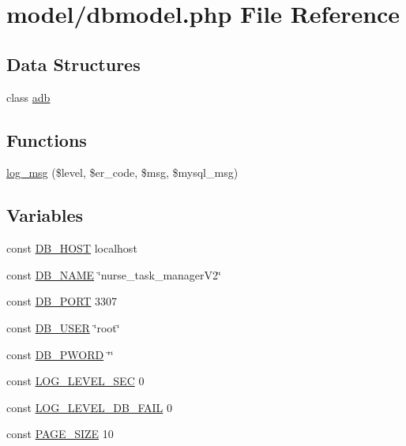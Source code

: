 \hypertarget{dbmodel_8php}{}\section{model/dbmodel.php File Reference}
\label{dbmodel_8php}
\subsection*{Data Structures}
\begin{DoxyCompactItemize}
\item 
class \hyperlink{classadb}{adb}
\end{DoxyCompactItemize}
\subsection*{Functions}
\begin{DoxyCompactItemize}
\item 
\hyperlink{dbmodel_8php_a1e25554d72181a453541a67aacceb663}{log\+\_\+msg} (\$level, \$er\+\_\+code, \$msg, \$mysql\+\_\+msg)
\end{DoxyCompactItemize}
\subsection*{Variables}
\begin{DoxyCompactItemize}
\item 
const \hyperlink{dbmodel_8php_a293363d7988627f671958e2d908c202a}{D\+B\+\_\+\+H\+O\+S\+T} \textquotesingle{}localhost\textquotesingle{}
\item 
const \hyperlink{dbmodel_8php_ab5db0d3504f917f268614c50b02c53e2}{D\+B\+\_\+\+N\+A\+M\+E} \char`\"{}nurse\+\_\+task\+\_\+manager\+V2\char`\"{}
\item 
const \hyperlink{dbmodel_8php_a5a1723fe7208eb06dad75185af8c3f06}{D\+B\+\_\+\+P\+O\+R\+T} 3307
\item 
const \hyperlink{dbmodel_8php_a1d1d99f8e08f387d84fe9848f3357156}{D\+B\+\_\+\+U\+S\+E\+R} \char`\"{}root\char`\"{}
\item 
const \hyperlink{dbmodel_8php_a83045a6202d81e1bd45c5bf19773579a}{D\+B\+\_\+\+P\+W\+O\+R\+D} \char`\"{}\char`\"{}
\item 
const \hyperlink{dbmodel_8php_a335d166b8615583931d3ff798c6e2fb1}{L\+O\+G\+\_\+\+L\+E\+V\+E\+L\+\_\+\+S\+E\+C} 0
\item 
const \hyperlink{dbmodel_8php_a44b26ee05d02c7acb05e8b44bbfe4a76}{L\+O\+G\+\_\+\+L\+E\+V\+E\+L\+\_\+\+D\+B\+\_\+\+F\+A\+I\+L} 0
\item 
const \hyperlink{dbmodel_8php_a4634a091c35db33009455321e1d259e3}{P\+A\+G\+E\+\_\+\+S\+I\+Z\+E} 10
\end{DoxyCompactItemize}


